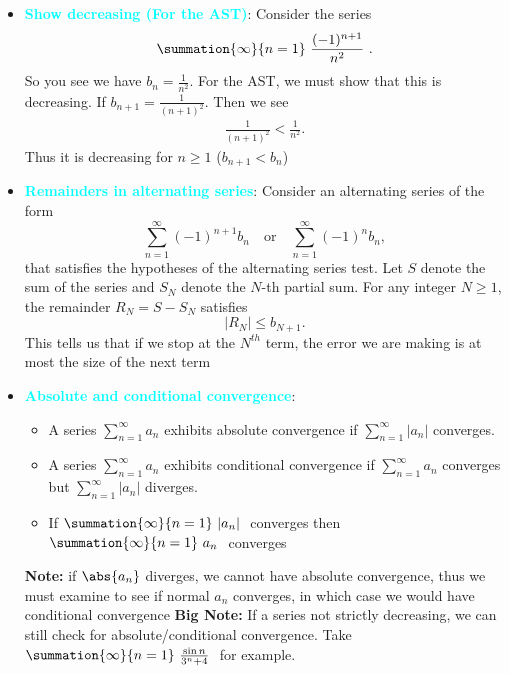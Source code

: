 \documentclass{report}
\begin{document}
\begin{itemize}
\item \textbf{\textcolor{cyan}{Show decreasing (For the AST)}}: Consider the series
    \begin{align*}
        \summation{\infty}{n=1}\ \frac{(-1)^{n+1}}{n^{2}}\ 
    .\end{align*}
    \bigbreak \noindent 
    So you see we have $b_{n}=  \frac{1}{n^{2}}$. For the AST, we must show that this is decreasing. If $b_{n+1} = \frac{1}{(n+1)^{2}}$. Then we see
    \begin{align*}
        \frac{1}{(n+1)^{2}} < \frac{1}{n^{2}}
    .\end{align*}
    \bigbreak \noindent 
    Thus it is decreasing for $n \geq 1$ ($b_{n+1} < b_{n}$)
    \blacksquare
\item \textbf{\textcolor{cyan}{Remainders in alternating series}}:
    Consider an alternating series of the form
    \[
        \sum_{n=1}^{\infty} (-1)^{n+1} b_n \quad \text{or} \quad \sum_{n=1}^{\infty} (-1)^n b_n,
    \]
    that satisfies the hypotheses of the alternating series test. Let \( S \) denote the sum of the series and \( S_N \) denote the \( N \)-th partial sum. For any integer \( N \geq 1 \), the remainder \( R_N = S - S_N \) satisfies
    \[
        \lvert R_N \rvert \leq b_{N+1}.
    \]
    This tells us that if we stop at the $N^{th}$ term, the error we are making is at most the size of the next term
\item \textbf{\textcolor{cyan}{Absolute and conditional convergence}}:
    \begin{itemize}
        \item A series \(\sum_{n=1}^{\infty} a_n\) exhibits absolute convergence if \(\sum_{n=1}^{\infty} |a_n|\) converges.
        \item A series \(\sum_{n=1}^{\infty} a_n\) exhibits conditional convergence if \(\sum_{n=1}^{\infty} a_n\) converges but \(\sum_{n=1}^{\infty} |a_n|\) diverges.
        \item If $\summation{\infty}{n=1}\ \lvert a_{n} \rvert\ $ converges then $\summation{\infty}{n=1}\ a_{n}\ $ converges
    \end{itemize}
    \bigbreak \noindent 
    \textbf{Note:} if $\abs{a_{n}}$ diverges, we cannot have absolute convergence, thus we must examine to see if normal $a_{n}$ converges, in which case we would have conditional convergence
    \bigbreak \noindent 
    \textbf{Big Note:} If a series not strictly decreasing, we can still check for absolute/conditional convergence. Take $\summation{\infty}{n=1}\ \frac{\sin{n}}{3^{n} + 4}\  $ for example.

\end{itemize}
\end{document}
